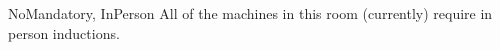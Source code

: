 


	{NoMandatory, InPerson}%
	{All of the machines in this room (currently) require in person inductions.} %
	{%
	}
	{%
	
	}

